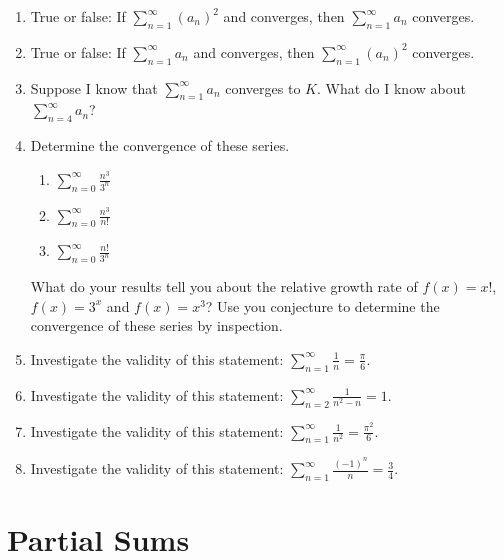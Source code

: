 \begin{enumerate}
\item True or false: If $\displaystyle\sum _{n = 1}^\infty  {\left( {a_n } \right)^2 } $ and converges, then $\displaystyle\sum _{n = 1}^\infty  {a_n } 
$ converges.

\item True or false: If $\displaystyle\sum _{n = 1}^\infty  {a_n } $ and converges, then $\displaystyle\sum _{n = 1}^\infty  {\left( {a_n } \right)^2 } $ converges.

\item Suppose I know that $\displaystyle\sum _{n = 1}^\infty  {a_n } $
 converges to $K$.  What do I know about $\displaystyle\sum _{n = 4}^\infty  {a_n } $?

\item Determine the convergence of these series.  \begin{enumerate}\item $\displaystyle\sum\limits_{n = 0}^\infty  {\frac{{n^3 }}{{3^n }}} $	\item $\displaystyle\sum\limits_{n = 0}^\infty  {\frac{{n^3 }}{{n!}}} $	\item $\displaystyle\sum\limits_{n = 0}^\infty  {\frac{{n!}}{{3^n }}} $
\end{enumerate}

What do your results tell you about the relative growth rate of $f(x) = x!$, $f(x) = 3^x$ and $f(x) = x^3$?  Use you conjecture to determine the convergence of these series by inspection.
 	 	 
 	 	 	

\item Investigate the validity of this statement:  $
\displaystyle\sum\limits_{n = 1}^\infty  {\frac{1}{n}}  = \frac{\pi }{6}$.

\item Investigate the validity of this statement:  $
\displaystyle\sum\limits_{n = 2}^\infty  {\frac{1}{{n^2  - n}}}  = 1$.

\item Investigate the validity of this statement:  $
\displaystyle\sum\limits_{n = 1}^\infty  {\frac{1}{{n^2 }}}  = \frac{{\pi ^2 }}{6}$.

\item Investigate the validity of this statement:  $
\displaystyle\sum\limits_{n = 1}^\infty  {\frac{{\left( { - 1} \right)^n }}{n}}  = \frac{3}{4}$.

\end{enumerate}\section{Partial Sums}\begin{enumerate}


\end{enumerate}
